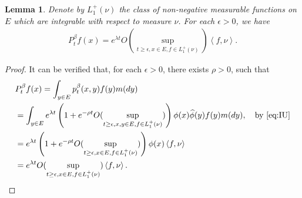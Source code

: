 \documentclass[12pt,a4paper]{amsart}
\numberwithin{equation}{section}
\theoremstyle{plain}
\newtheorem{lem}[thm]{Lemma}
\theoremstyle{definition}
\begin{document}
\begin{lem}
\label{lem:Pf_and_fnu}
  Denote by $L_1^+(\nu)$ the class of non-negative measurable functions on $E$ which are integrable with respect to measure $\nu$.
For each $\epsilon > 0$, we have
  \begin{align}
    P^\beta_t f(x) = e^{\lambda t} O(\sup_{t\geq \epsilon, x\in E, f\in L_1^+(\nu)}) \left\langle f, \nu \right\rangle.  
  \end{align}
\end{lem}
\begin{proof}
  It can be verified that, for each $\epsilon > 0$, there exists $\rho > 0$, such that
  \begin{align}
    & P^\beta_t f(x) = \int_{y\in E} p^\beta_t (x,y)f(y) m(dy)
    \\&  = \int_{y\in E}  e^{\lambda t}\left (1+ e^{-\rho t} O(\sup_{t \geq \epsilon, x,y\in E, f\in L_1^+(\nu)})\right)\phi(x) \widehat \phi(y) f(y) m(dy) ,\quad\text{by~\eqref{eq:IU}}
    \\&  =   e^{\lambda t}\left(1+ e^{-\rho t} O(\sup_{t \geq \epsilon, x\in E, f\in L_1^+(\nu)})\right)\phi(x) \left\langle f,\nu \right\rangle \label{eq:IU_for_Ptf} 
    \\&= e^{\lambda t} O(\sup_{t\geq \epsilon, x\in E, f\in L_1^+(\nu)}) \left\langle f, \nu \right\rangle. 
\qedhere 
  \end{align}
\end{proof}
\end{document}
